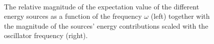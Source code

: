 \begin{frame}
 \captionsetup[subfloat]{labelformat=empty}
\begin{figure}[h]
 \begin{center}
   \\
  \caption{The relative magnitude of the expectation value of the different energy sources as a function of the frequency $\omega$ (left) together with the magnitude of the sources' energy contributions scaled with the oscillator frequency (right).}
  \label{fig:E_dist_qdots}
 \end{center}
\end{figure}
\end{frame}



